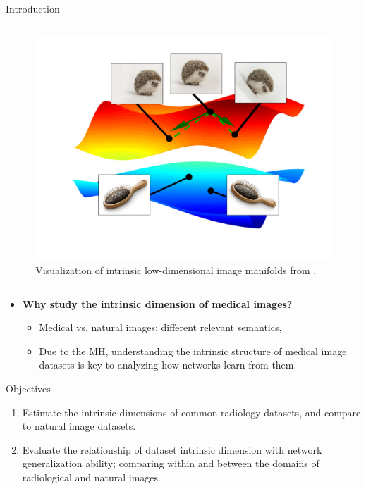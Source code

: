 \documentclass[final,hyperref={pdfpagelabels=false}]{beamer}
\begin{document}
\begin{frame}[t]
\begin{columns}[t]
\begin{column}{.47\textwidth}
\begin{block}{Introduction}
\begin{columns}
\begin{column}{.43\textwidth} %
\centering
\begin{figure}
    \includegraphics[width=0.8\linewidth]{buchanan_etal_fig1.pdf}
     \caption{\,Visualization of intrinsic low-dimensional image manifolds from \cite{buchanan2021deep}.}
\end{figure}
\end{column}
\end{columns} %
\begin{itemize}
\item \textbf{Why study the intrinsic dimension of medical images?}
    \begin{itemize}
        \item Medical vs. natural images: different relevant semantics, 
        \item Due to the MH, understanding the intrinsic structure of medical image datasets is key to analyzing how networks learn from them.
    \end{itemize}
\end{itemize}

\end{block}

\begin{block}{Objectives}

\begin{enumerate}
\item Estimate the intrinsic dimensions of common radiology datasets, and compare to natural image datasets.
\item Evaluate the relationship of dataset intrinsic dimension with network generalization ability; comparing within and between the domains of radiological and natural images.
\end{enumerate}


\end{block}
\end{column}
\end{columns}
\end{frame}
\end{document}
